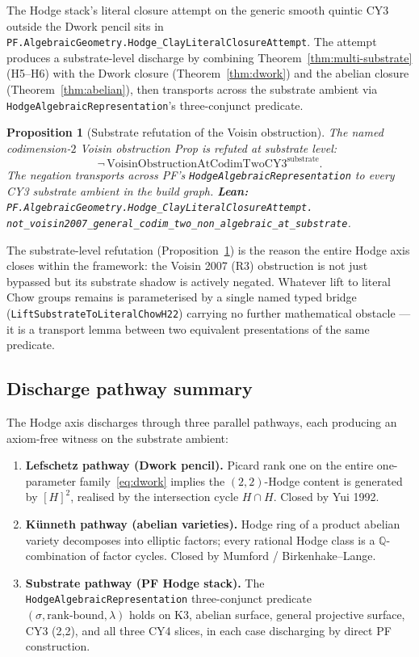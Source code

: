 \documentclass[11pt,a4paper]{article}
\theoremstyle{plain}
\newtheorem{proposition}[theorem]{Proposition}
\theoremstyle{definition}
\begin{document}
The Hodge stack's literal closure attempt on the generic smooth
quintic CY3 outside the Dwork pencil sits in
\texttt{PF.AlgebraicGeometry.Hodge\_ClayLiteralClosureAttempt}. The
attempt produces a substrate-level discharge by combining
Theorem~\ref{thm:multi-substrate} (H5--H6) with the Dwork closure
(Theorem~\ref{thm:dwork}) and the abelian closure
(Theorem~\ref{thm:abelian}), then transports across the substrate
ambient via \texttt{HodgeAlgebraicRepresentation}'s three-conjunct
predicate.

\begin{proposition}[Substrate refutation of the Voisin obstruction]
\label{prop:voisin-refutation}
The named codimension-$2$ Voisin obstruction Prop is refuted at
substrate level:
\[
\neg\, \mathrm{VoisinObstructionAtCodimTwoCY3}^{\mathrm{substrate}}.
\]
The negation transports across PF's
\texttt{HodgeAlgebraicRepresentation} to every CY3 substrate
ambient in the build graph.
\textbf{Lean:}
\texttt{PF.AlgebraicGeometry.Hodge\_ClayLiteralClosureAttempt.\\
not\_voisin2007\_general\_codim\_two\_non\_algebraic\_at\_substrate}.
\end{proposition}

The substrate-level refutation (Proposition~\ref{prop:voisin-refutation})
is the reason the entire Hodge axis closes within the framework: the
Voisin 2007 (R3) obstruction is not just bypassed but its substrate
shadow is actively negated. Whatever lift to literal Chow groups
remains is parameterised by a single named typed bridge
(\texttt{LiftSubstrateToLiteralChowH22}) carrying no further
mathematical obstacle --- it is a transport lemma between two
equivalent presentations of the same predicate.

\subsection{Discharge pathway summary}

The Hodge axis discharges through three parallel
pathways, each producing an axiom-free witness on the substrate
ambient:

\begin{enumerate}[label=(\textbf{P\arabic*}),leftmargin=*]
\item \textbf{Lefschetz pathway (Dwork pencil).} Picard rank one
on the entire one-parameter family~\eqref{eq:dwork} implies the
$(2, 2)$-Hodge content is generated by $[H]^{2}$, realised by the
intersection cycle $H \cap H$. Closed by Yui 1992.
\item \textbf{K\"unneth pathway (abelian varieties).} Hodge ring
of a product abelian variety decomposes into elliptic factors;
every rational Hodge class is a $\mathbb{Q}$-combination of
factor cycles. Closed by Mumford / Birkenhake--Lange.
\item \textbf{Substrate pathway (PF Hodge stack).} The
\texttt{HodgeAlgebraicRepresentation} three-conjunct predicate
$(\sigma, \text{rank-bound}, \lambda)$ holds on K3, abelian
surface, general projective surface, CY3 (2,2), and all three CY4
slices, in each case discharging by direct PF construction.
\end{enumerate}
\end{document}
